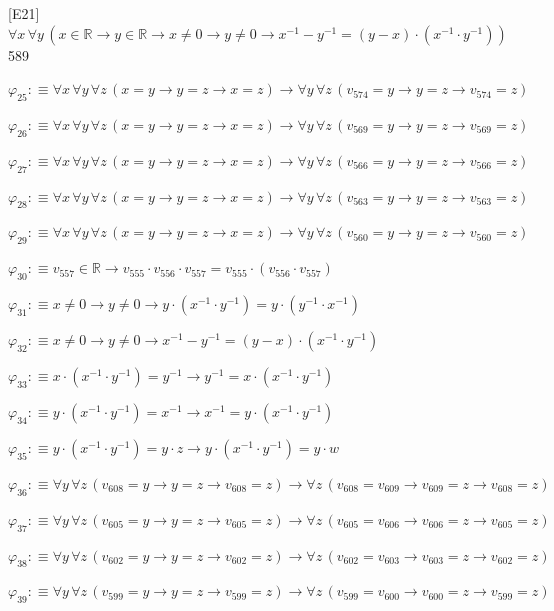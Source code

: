 \begin{fullproof}{[E21]}{$\forall x\,\forall y\,(x \in \mathbb{R} \to y \in \mathbb{R} \to x \neq 0 \to y \neq 0 \to x^{-1} - y^{-1} = (y - x) \cdot (x^{-1} \cdot y^{-1}))$}{589}
\begin{abbrevlist}
\item $\varphi_{25} :\equiv \forall x\,\forall y\,\forall z\,(x = y \to y = z \to x = z) \to \forall y\,\forall z\,(v_{574} = y \to y = z \to v_{574} = z)$
\item $\varphi_{26} :\equiv \forall x\,\forall y\,\forall z\,(x = y \to y = z \to x = z) \to \forall y\,\forall z\,(v_{569} = y \to y = z \to v_{569} = z)$
\item $\varphi_{27} :\equiv \forall x\,\forall y\,\forall z\,(x = y \to y = z \to x = z) \to \forall y\,\forall z\,(v_{566} = y \to y = z \to v_{566} = z)$
\item $\varphi_{28} :\equiv \forall x\,\forall y\,\forall z\,(x = y \to y = z \to x = z) \to \forall y\,\forall z\,(v_{563} = y \to y = z \to v_{563} = z)$
\item $\varphi_{29} :\equiv \forall x\,\forall y\,\forall z\,(x = y \to y = z \to x = z) \to \forall y\,\forall z\,(v_{560} = y \to y = z \to v_{560} = z)$
\item $\varphi_{30} :\equiv v_{557} \in \mathbb{R} \to v_{555} \cdot v_{556} \cdot v_{557} = v_{555} \cdot (v_{556} \cdot v_{557})$
\item $\varphi_{31} :\equiv x \neq 0 \to y \neq 0 \to y \cdot (x^{-1} \cdot y^{-1}) = y \cdot (y^{-1} \cdot x^{-1})$
\item $\varphi_{32} :\equiv x \neq 0 \to y \neq 0 \to x^{-1} - y^{-1} = (y - x) \cdot (x^{-1} \cdot y^{-1})$
\item $\varphi_{33} :\equiv x \cdot (x^{-1} \cdot y^{-1}) = y^{-1} \to y^{-1} = x \cdot (x^{-1} \cdot y^{-1})$
\item $\varphi_{34} :\equiv y \cdot (x^{-1} \cdot y^{-1}) = x^{-1} \to x^{-1} = y \cdot (x^{-1} \cdot y^{-1})$
\item $\varphi_{35} :\equiv y \cdot (x^{-1} \cdot y^{-1}) = y \cdot z \to y \cdot (x^{-1} \cdot y^{-1}) = y \cdot w$
\item $\varphi_{36} :\equiv \forall y\,\forall z\,(v_{608} = y \to y = z \to v_{608} = z) \to \forall z\,(v_{608} = v_{609} \to v_{609} = z \to v_{608} = z)$
\item $\varphi_{37} :\equiv \forall y\,\forall z\,(v_{605} = y \to y = z \to v_{605} = z) \to \forall z\,(v_{605} = v_{606} \to v_{606} = z \to v_{605} = z)$
\item $\varphi_{38} :\equiv \forall y\,\forall z\,(v_{602} = y \to y = z \to v_{602} = z) \to \forall z\,(v_{602} = v_{603} \to v_{603} = z \to v_{602} = z)$
\item $\varphi_{39} :\equiv \forall y\,\forall z\,(v_{599} = y \to y = z \to v_{599} = z) \to \forall z\,(v_{599} = v_{600} \to v_{600} = z \to v_{599} = z)$

\end{abbrevlist}
\end{fullproof}
